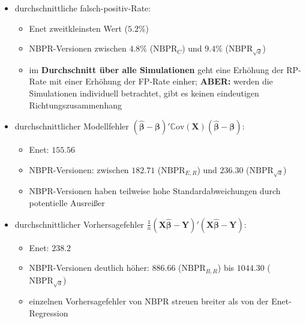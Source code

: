 \documentclass{beamer}
\begin{document}
\begin{frame}
	\begin{itemize}
	\item durchschnittliche falsch-positiv-Rate:
	\begin{itemize}
	\item Enet zweitkleinsten Wert ($5.2\%$)
	\item NBPR-Versionen zwischen $4.8\%$ ($\text{NBPR}_{C}$) und $9.4\%$ ($\text{NBPR}_{\sqrt{d}}$)
	\item im \textbf{Durchschnitt über alle Simulationen} geht eine Erhöhung der RP-Rate mit einer Erhöhung der FP-Rate einher; \textbf{ABER:} werden die Simulationen individuell betrachtet, gibt es keinen eindeutigen Richtungszusammenhang  
	\end{itemize}
	\end{itemize}
\end{frame}


\begin{frame}
	\begin{itemize}
	\item durchschnittlicher Modellfehler $(\boldsymbol{\hat{\beta}}- \boldsymbol{\beta})'\mathbb{C}\text{ov}(\mathbf{X})(\boldsymbol{\hat{\beta}}- \boldsymbol{\beta})$:
	\begin{itemize}
	\item Enet: $155.56$
	\item NBPR-Versionen: zwischen $182.71$ ($\text{NBPR}_{E,R}$) und $236.30$ ($\text{NBPR}_{\sqrt{d}}$)
	\item NBPR-Versionen haben teilweise hohe Standardabweichungen durch potentielle Ausreißer
	\end{itemize}
	\item durchschnittlicher Vorhersagefehler $\frac{1}{n}(\mathbf{X}\boldsymbol{\hat{\beta}}- \mathbf{Y})'(\mathbf{X}\boldsymbol{\hat{\beta}}- \mathbf{Y})$:
	\begin{itemize}
	\item Enet: $238.2$
	\item NBPR-Versionen deutlich höher: $886.66$ ($\text{NBPR}_{B,R}$) bis $1044.30$ ($\text{NBPR}_{\sqrt{d}}$)
	\item einzelnen Vorhersagefehler von NBPR streuen breiter als von der Enet-Regression 
	\end{itemize}
	\end{itemize}
\end{frame}
\end{document}
